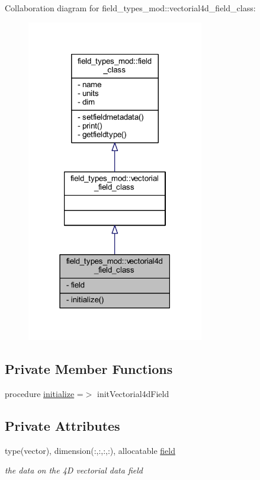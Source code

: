 Collaboration diagram for field\+\_\+types\+\_\+mod\+:\+:vectorial4d\+\_\+field\+\_\+class\+:\nopagebreak
\begin{figure}[H]
\begin{center}
\leavevmode
\includegraphics[width=219pt]{structfield__types__mod_1_1vectorial4d__field__class__coll__graph}
\end{center}
\end{figure}
\subsection*{Private Member Functions}
\begin{DoxyCompactItemize}
\item 
procedure \mbox{\hyperlink{structfield__types__mod_1_1vectorial4d__field__class_a5a6444cceeb9c973c2a44b28fa57b06f}{initialize}} =$>$ init\+Vectorial4d\+Field
\end{DoxyCompactItemize}
\subsection*{Private Attributes}
\begin{DoxyCompactItemize}
\item 
type(vector), dimension(\+:,\+:,\+:,\+:), allocatable \mbox{\hyperlink{structfield__types__mod_1_1vectorial4d__field__class_af6bfcd2fc8d810cedd160e3ade52698f}{field}}
\begin{DoxyCompactList}\small\item\em the data on the 4D vectorial data field \end{DoxyCompactList}\end{DoxyCompactItemize}


